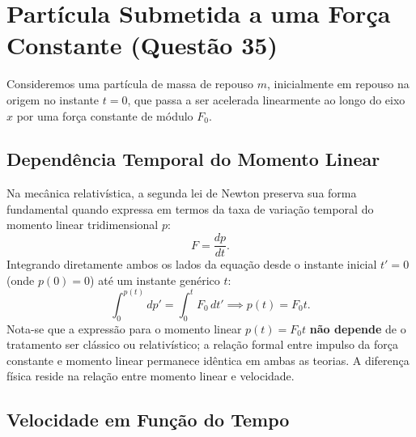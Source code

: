 \documentclass[11pt, a4paper]{article}
\begin{document}
\section{Partícula Submetida a uma Força Constante (Questão 35)}

Consideremos uma partícula de massa de repouso $m$, inicialmente em repouso na origem no instante $t = 0$, que passa a ser acelerada linearmente ao longo do eixo $x$ por uma força constante de módulo $F_0$.

\subsection{Dependência Temporal do Momento Linear}

Na mecânica relativística, a segunda lei de Newton preserva sua forma fundamental quando expressa em termos da taxa de variação temporal do momento linear tridimensional $p$:
\begin{equation}
F = \frac{dp}{dt}.
\end{equation}
Integrando diretamente ambos os lados da equação desde o instante inicial $t' = 0$ (onde $p(0) = 0$) até um instante genérico $t$:
\begin{equation}
\int_{0}^{p(t)} dp' = \int_{0}^{t} F_0 \, dt' \implies p(t) = F_0 t.
\end{equation}
Nota-se que a expressão para o momento linear $p(t) = F_0 t$ \textbf{não depende} de o tratamento ser clássico ou relativístico; a relação formal entre impulso da força constante e momento linear permanece idêntica em ambas as teorias. A diferença física reside na relação entre momento linear e velocidade.

\subsection{Velocidade em Função do Tempo}
\end{document}
